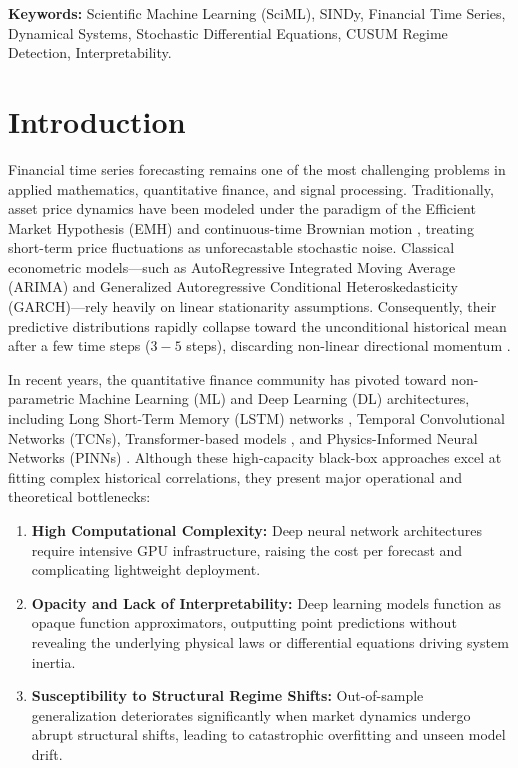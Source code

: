 \documentclass[11pt,a4paper]{article}
\begin{document}
\vspace{0.5em}
\noindent\textbf{Keywords:} Scientific Machine Learning (SciML), SINDy, Financial Time Series, Dynamical Systems, Stochastic Differential Equations, CUSUM Regime Detection, Interpretability.

\vspace{1.5em}

\section{Introduction}
\label{sec:intro}

Financial time series forecasting remains one of the most challenging problems in applied mathematics, quantitative finance, and signal processing. Traditionally, asset price dynamics have been modeled under the paradigm of the Efficient Market Hypothesis (EMH) and continuous-time Brownian motion \cite{fama1970efficient}, treating short-term price fluctuations as unforecastable stochastic noise. Classical econometric models---such as AutoRegressive Integrated Moving Average (ARIMA) and Generalized Autoregressive Conditional Heteroskedasticity (GARCH)---rely heavily on linear stationarity assumptions. Consequently, their predictive distributions rapidly collapse toward the unconditional historical mean after a few time steps ($3-5$ steps), discarding non-linear directional momentum \cite{box1970time, bollerslev1986generalized}.

In recent years, the quantitative finance community has pivoted toward non-parametric Machine Learning (ML) and Deep Learning (DL) architectures, including Long Short-Term Memory (LSTM) networks \cite{hochreiter1997long, fischer2018deep}, Temporal Convolutional Networks (TCNs), Transformer-based models \cite{vaswani2017attention, zhou2021informer}, and Physics-Informed Neural Networks (PINNs) \cite{raissi2019physics}. Although these high-capacity black-box approaches excel at fitting complex historical correlations, they present major operational and theoretical bottlenecks:
\begin{enumerate}[leftmargin=1.5em]
    \item \textbf{High Computational Complexity:} Deep neural network architectures require intensive GPU infrastructure, raising the cost per forecast and complicating lightweight deployment.
    \item \textbf{Opacity and Lack of Interpretability:} Deep learning models function as opaque function approximators, outputting point predictions without revealing the underlying physical laws or differential equations driving system inertia.
    \item \textbf{Susceptibility to Structural Regime Shifts:} Out-of-sample generalization deteriorates significantly when market dynamics undergo abrupt structural shifts, leading to catastrophic overfitting and unseen model drift.
\end{enumerate}
\end{document}
